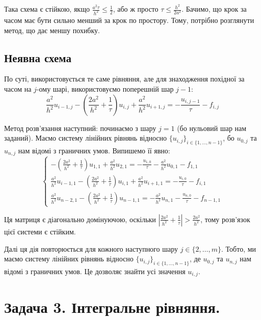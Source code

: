 \documentclass{test_template}
\begin{document}
Така схема є стійкою, якщо $\frac{a^2\tau}{h^2} \leq \frac{1}{2}$, або ж просто
$\tau \leq \frac{h^2}{2a^2}$. Бачимо, що крок за часом має бути сильно менший 
за крок по простору. Тому, потрібно розглянути метод, що дає меншу похибку.

\subsection{Неявна схема}

По суті, використовується те саме рівняння, але для знаходження 
похідної за часом на $j$-ому шарі, використовуємо поперешній шар $j-1$:
\begin{equation*}
    \frac{a^2}{h^2}u_{i-1,j} - \left(\frac{2a^2}{h^2} + \frac{1}{\tau}\right)u_{i,j} + \frac{a^2}{h^2} u_{i+1,j} = -\frac{u_{i,j-1}}{\tau} - f_{i,j}
\end{equation*}

Метод розв'язання наступний: починаємо з шару $j=1$ (бо нульовий шар нам
заданий). Маємо систему лінійних рівнянь відносно $\{u_{i,j}\}_{i \in
\{1,\dots,n-1\}}$, бо $u_{0,j}$ та $u_{n,j}$ нам відомі з граничних умов.
Випишемо її явно:
\begin{equation*}
    \begin{cases}
        - \left(\frac{2a^2}{h^2} + \frac{1}{\tau}\right)u_{1,1} + \frac{a^2}{h^2} u_{2,1} = -\frac{u_{1,0}}{\tau} - \frac{a^2}{h^2}u_{0,1} - f_{1,1} \\
        \frac{a^2}{h^2}u_{i-1,1} - \left(\frac{2a^2}{h^2} + \frac{1}{\tau}\right)u_{i,1} + \frac{a^2}{h^2} u_{i+1,1} = -\frac{u_{i,0}}{\tau} - f_{i,1} \\
        \frac{a^2}{h^2}u_{n-2,1} - \left(\frac{2a^2}{h^2} + \frac{1}{\tau}\right)u_{n-1,1} = - \frac{a^2}{h^2} u_{n,1} -\frac{u_{n,0}}{\tau} - f_{n-1,1}
    \end{cases}
\end{equation*}

Ця матриця є діагонально домінуючою, оскільки $\left|\frac{2a^2}{h^2} +
\frac{1}{\tau}\right| > \frac{2a^2}{h^2}$, тому розв'язок цієї 
системи є стійким. 

Далі ця дія повторюється для кожного наступного шару $j \in \{2,\dots,m\}$.
Тобто, ми маємо систему лінійних рівнянь відносно $\{u_{i,j}\}_{i \in
\{1,\dots,n-1\}}$, де $u_{0,j}$ та $u_{n,j}$ нам відомі з граничних умов. Це
дозволяє знайти усі значення $u_{i,j}$.

\newpage

\section{Задача 3. Інтегральне рівняння.}
\end{document}
